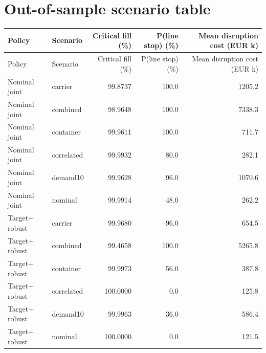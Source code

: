 \documentclass[11pt]{article}
\begin{document}
\section{Out-of-sample scenario table}
\begin{longtable}{llrrr}
\toprule
Policy & Scenario & Critical fill (\%) & P(line stop) (\%) & Mean disruption cost (EUR k) \\
\midrule
\endfirsthead
\toprule
Policy & Scenario & Critical fill (\%) & P(line stop) (\%) & Mean disruption cost (EUR k) \\
\midrule
\endhead
Nominal joint & carrier & 99.8737 & 100.0 & 1205.2 \\
Nominal joint & combined & 98.9648 & 100.0 & 7338.3 \\
Nominal joint & container & 99.9611 & 100.0 & 711.7 \\
Nominal joint & correlated & 99.9932 & 80.0 & 282.1 \\
Nominal joint & demand10 & 99.9628 & 96.0 & 1070.6 \\
Nominal joint & nominal & 99.9914 & 48.0 & 262.2 \\
Target+ robust & carrier & 99.9680 & 96.0 & 654.5 \\
Target+ robust & combined & 99.4658 & 100.0 & 5265.8 \\
Target+ robust & container & 99.9973 & 56.0 & 387.8 \\
Target+ robust & correlated & 100.0000 & 0.0 & 125.8 \\
Target+ robust & demand10 & 99.9963 & 36.0 & 586.4 \\
Target+ robust & nominal & 100.0000 & 0.0 & 121.5 \\
\bottomrule
\end{longtable}
\end{document}
